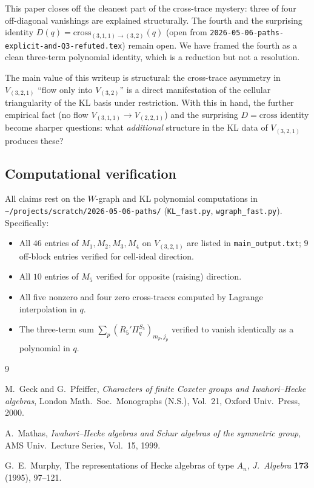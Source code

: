 \documentclass[11pt]{article}
\theoremstyle{definition}
\begin{document}
This paper closes off the cleanest part of the cross-trace mystery: three of four off-diagonal vanishings are explained structurally. The fourth and the surprising identity $D(q) = \mathrm{cross}_{(3,1,1)\to(3,2)}(q)$ (open from \texttt{2026-05-06-paths-explicit-and-Q3-refuted.tex}) remain open. We have framed the fourth as a clean three-term polynomial identity, which is a reduction but not a resolution.

The main value of this writeup is structural: the cross-trace asymmetry in $V_{(3,2,1)}$ ``flow only into $V_{(3,2)}$'' is a direct manifestation of the cellular triangularity of the KL basis under restriction. With this in hand, the further empirical fact (no flow $V_{(3,1,1)} \to V_{(2,2,1)}$) and the surprising $D = \mathrm{cross}$ identity become sharper questions: what \emph{additional} structure in the KL data of $V_{(3,2,1)}$ produces these?

\subsection*{Computational verification}

All claims rest on the $W$-graph and KL polynomial computations in \texttt{\textasciitilde/projects/scratch/2026-05-06-paths/} (\texttt{KL\_fast.py}, \texttt{wgraph\_fast.py}). Specifically:
\begin{itemize}[leftmargin=2em,topsep=0.1em,itemsep=0.1em]
\item All $46$ entries of $M_1, M_2, M_3, M_4$ on $V_{(3,2,1)}$ are listed in \texttt{main\_output.txt}; $9$ off-block entries verified for cell-ideal direction.
\item All $10$ entries of $M_5$ verified for opposite (raising) direction.
\item All five nonzero and four zero cross-traces computed by Lagrange interpolation in $q$.
\item The three-term sum $\sum_p (R_5'\Pi_q^{S_5})_{m_p, j_p}$ verified to vanish identically as a polynomial in $q$.
\end{itemize}

\begin{thebibliography}{9}

M.~Geck and G.~Pfeiffer, \emph{Characters of finite Coxeter groups and Iwahori--Hecke algebras}, London Math.\ Soc.\ Monographs (N.S.), Vol.~21, Oxford Univ.\ Press, 2000.

A.~Mathas, \emph{Iwahori--Hecke algebras and Schur algebras of the symmetric group}, AMS Univ.\ Lecture Series, Vol.~15, 1999.

G.~E.~Murphy, The representations of Hecke algebras of type $A_n$, \emph{J.~Algebra} \textbf{173} (1995), 97--121.

\end{thebibliography}
\end{document}
